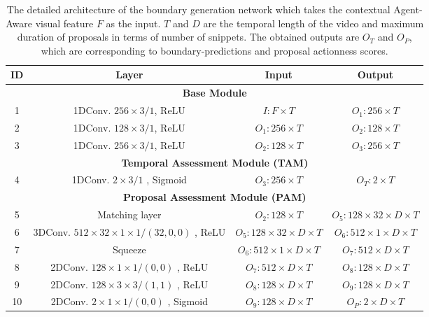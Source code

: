 \documentclass{ieeeaccess}
\begin{document}
\begin{table*}[!t]
\centering
\caption{The detailed architecture of the boundary generation network which takes the contextual Agent-Aware visual feature $F$  as the input. $T$ and $D$ are the temporal length of the video and maximum duration of proposals in terms of number of snippets. The obtained outputs are $O_T$ and $O_P$, which are corresponding to boundary-predictions and proposal actionness scores.}

\begin{tabular}{c|c|c|c}
\hline
\textbf{ID} & \textbf{Layer} & \textbf{Input}  & \textbf{Output} \\
\hline \hline
\multicolumn{4}{c}{\textbf{Base Module}} \\
\hline
1 & 1DConv.  \newline $256\times3/1$, ReLU & $I: F \times T$ & $O_1: 256\times T$\\
\hline
2 & 1DConv. \newline $128\times3/1$, ReLU & $O_1:256\times T$ & $O_2: 128\times T$\\
\hline
3 & 1DConv.  \newline $256\times3/1$, ReLU & $O_2:128\times T$ & $O_3: 256\times T$\\
\hline
\hline
\multicolumn{4}{c}{\textbf{Temporal Assessment Module (TAM)}} \\
\hline
4 & 1DConv.  \newline $2\times3/1$ , Sigmoid &  $O_3:256\times T$ & $O_T: 2\times T$\\
\hline
\hline
\multicolumn{4}{c}{\textbf{Proposal Assessment Module (PAM)}} \\
\hline
5 & Matching layer & $O_2:128\times T$ & $O_5:128\times32\times D \times T$\\
\hline
6 & 3DConv.  \newline $512\times32\times1\times1/(32,0,0)$ , ReLU &  $O_5:128\times32\times D\times T$ & $O_6:512\times 1 \times D \times T$\\
 \hline
7 & Squeeze   &  $O_6: 512\times 1 \times D \times T$ & $O_7: 512\times D \times T$\\
 \hline
8 & 2DConv.  \newline $128\times1\times1/(0,0)$ , ReLU &  $O_7:512\times D \times T$ & $O_8:128 \times D \times T$\\
 
 \hline
9 & 2DConv.  \newline $128\times3\times3/(1,1)$ , ReLU &  $O_8:128\times D \times T$ & $O_9:128\times D \times T$\\
 \hline
10 & 2DConv.  \newline $2\times1\times1/(0,0)$ , Sigmoid &  $O_9: 128\times D \times T$ & $O_P:2\times D \times T$\\
\hline
\end{tabular}
\label{tab:bmn}
\end{table*}
\end{document}
